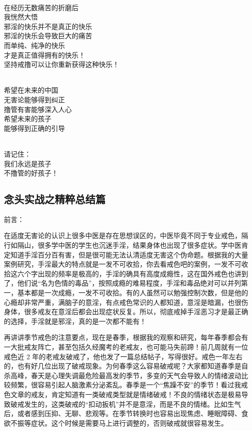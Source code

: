 \begin{center}
\begin{multicols}{2}
        ~\\

        在经历无数痛苦的折磨后 \\ 我恍然大悟 \\ 邪淫的快乐并不是真正的快乐 \\ 邪淫的快乐会导致巨大的痛苦 \\ 而单纯、纯净的快乐 \\ 才是真正值得拥有的快乐！ \\ 坚持戒撸可以让你重新获得这种快乐！

        ~\\

        希望在未来的中国 \\ 无害论能够得到纠正 \\ 撸管有害能够深入人心 \\ 希望未来的孩子 \\ 能够得到正确的引导

        ~\\

        请记住： \\ 我们永远是孩子 \\ 不撸管的好孩子！
    \end{multicols}
\end{center}

\subsection{念头实战之精粹总结篇}

前言：

在适度无害论的认识上很多中医是存在思想误区的，中医毕竟不同于专业戒色，隔行如隔山，很多学中医的学生也沉迷手淫，结果身体也出现了很多症状。学中医肯定知道手淫百分百有害，但是很可能无法认清适度无害这个伪命题。根据我的大量案例研究，手淫最大的特点就是一发不可收拾，你去看戒色吧的案例，一发不可收拾这六个字出现的频率是极高的，手淫的确具有高度成瘾性，这在国外戒色也讲到了，他们说“名为色情的毒品”，按照成瘾的难易程度，手淫和毒品绝对可以并列第一，基本都是一次成瘾，一发不可收拾。有的人虽然可以勉强控制次数，但是他的心瘾却非常严重，满脑子的意淫，有点戒色常识的人都知道，意淫是暗漏，也很伤身体，很多戒友在意淫后都会出现症状反复。所以，彻底戒掉手淫恶习才是最正确的选择，手淫就是邪淫，真的是一次都不能有！

再讲讲季节戒色的注意要点，现在是春季，根据我的观察和研究，每年春季都会有一大批戒友阵亡，甚至包括久经魔考的老戒友，也可能马失前蹄！前几周就有一位戒色近 2 年的老戒友破戒了，他也发了一篇总结帖子，写得很好。戒色一年左右的，也有好几位出现了破戒现象。为何春季这么容易破戒呢？大家都知道春季是自杀高峰，春天是心理失调最危险最高发的季节，多变的天气会导致人的情绪波动比较频繁，很容易引起人脑激素分泌紊乱。春季是一个“焦躁不安”的季节！看过我戒色文章的戒友，肯定知道有一类破戒类型就是情绪破戒！不良的情绪状态是极易导致破戒发生的，这类破戒的“扣动扳机”并不是意淫，而是不良的情绪。比如生气后，或者感到压抑、无聊、悲观等。在季节转换时也容易出现焦虑、睡眠障碍、食欲不振等症状。这个时候是需要马上进行调整的，否则破戒就很容易发生。

